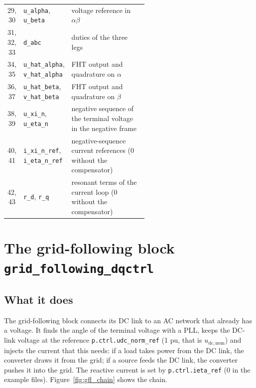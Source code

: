 \documentclass[11pt,a4paper]{scrartcl}
\newcommand{\ped}[1]{_{\mathrm{#1}}}
\newcommand{\code}[1]{\texttt{#1}}
\begin{document}
\begin{onehalfspace}
\begin{longtable}{@{} c l p{0.56\linewidth} @{}}
	29, 30 & \code{u\_alpha}, \code{u\_beta} & voltage reference in $\alpha\beta$ \\
	31, 32, 33 & \code{d\_abc} & duties of the three legs \\
	34, 35 & \code{u\_hat\_alpha}, \code{v\_hat\_alpha} & FHT output and quadrature on $\alpha$ \\
	36, 37 & \code{u\_hat\_beta}, \code{v\_hat\_beta} & FHT output and quadrature on $\beta$ \\
	38, 39 & \code{u\_xi\_n}, \code{u\_eta\_n} & negative sequence of the terminal voltage in the negative frame \\
	40, 41 & \code{i\_xi\_n\_ref}, \code{i\_eta\_n\_ref} & negative-sequence current references (0 without the compensator) \\
	42, 43 & \code{r\_d}, \code{r\_q} & resonant terms of the current loop (0 without the compensator) \\
\end{longtable}
\normalsize
\endgroup
\section{The grid-following block \code{grid\_following\_dqctrl}}
\label{sec:gfl}

\subsection{What it does}
\label{sec:gfl_purpose}

The grid-following block connects its DC link to an AC network that already has a voltage. It finds the angle of the terminal voltage with a PLL, keeps the DC-link voltage at the reference \code{p.ctrl.udc\_norm\_ref} (1 pu, that is $u\ped{dc,nom}$) and injects the current that this needs: if a load takes power from the DC link, the converter draws it from the grid; if a source feeds the DC link, the converter pushes it into the grid. The reactive current is set by \code{p.ctrl.ieta\_ref} (0 in the example files). Figure~\ref{fig:gfl_chain} shows the chain.


\end{onehalfspace}
\end{document}
